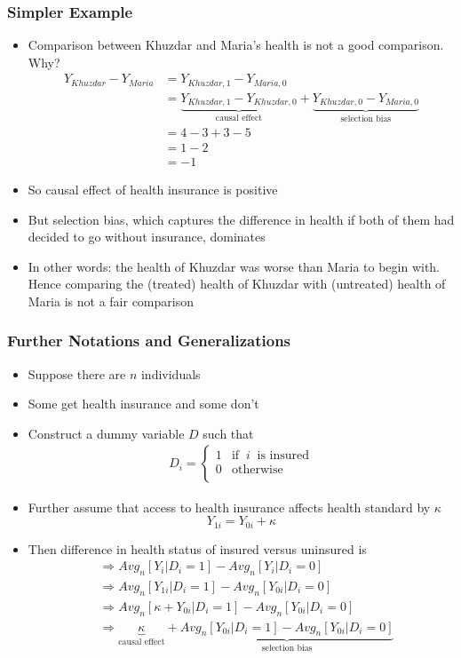 \documentclass{beamer}
\begin{document}
	\begin{frame}
		\frametitle{Simpler Example}
		\small
				\begin{itemize}
			\item Comparison between Khuzdar and Maria's health is not a good comparison. Why?
			\begin{align*}
				Y_{Khuzdar} - Y_{Maria} &= Y_{Khuzdar,1} - Y_{Maria, 0}\\		
				&= \underbrace{Y_{Khuzdar,1} - Y_{Khuzdar,0}}_{\text{causal effect}} + \underbrace{Y_{Khuzdar,0} - Y_{Maria, 0}}_{\text{selection bias}}\\
				&= 4 - 3 + 3 - 5\\
				&= 1 - 2\\
				&= -1    
			\end{align*}
			\item So causal effect of health insurance is positive
			\item But selection bias, which captures the difference in health if both of them had decided to go without insurance, dominates
			\item In other words: the health of Khuzdar was worse than Maria to begin with. Hence comparing the (treated) health of Khuzdar with (untreated) health of Maria is not a fair comparison
		\end{itemize}
	\end{frame}
	
	\begin{frame}
		\frametitle{Further Notations and Generalizations}
		\small
		\begin{itemize}
			\item Suppose there are $n$ individuals
			\item Some get health insurance and some don't
			\item Construct a dummy variable $D$ such that
			\begin{align*}
				D_i = \left\{\begin{array}{cc}
					1 & \text{if} \;\; i \;\; \text{is insured}\\
					0 & \text{otherwise}\\
				\end{array} \right.
			\end{align*}
			\item Further assume that access to health insurance affects health standard by $\kappa$ 
			$$ Y_{1i} = Y_{0i} + \kappa$$
			\item Then difference in health status of insured versus uninsured is
			\begin{align*}
				&\Rightarrow Avg_n[Y_i| D_i = 1] - Avg_n[Y_i| D_i = 0]\\
				&\Rightarrow Avg_n[Y_{1i}| D_i = 1] - Avg_n[Y_{0i}| D_i = 0]\\
				&\Rightarrow Avg_n[\kappa + Y_{0i}| D_i = 1] - Avg_n[Y_{0i}| D_i = 0]\\
				&\Rightarrow \underbrace{\kappa}_{\text{causal effect}} + \underbrace{Avg_n[Y_{0i}| D_i = 1] - Avg_n[Y_{0i}| D_i = 0]}_{\text{selection bias}}\\
			\end{align*}
		\end{itemize}
	\end{frame}
	
\end{document}
